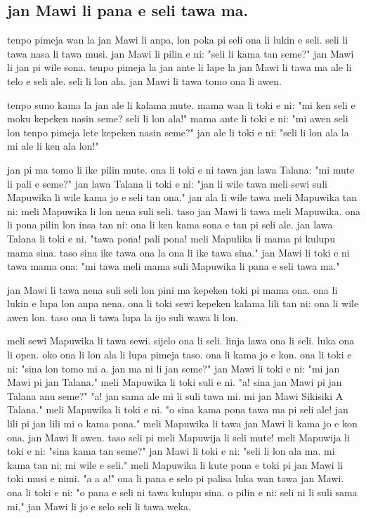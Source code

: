 \newpage
\subsection{jan Mawi li pana e seli tawa ma.}

tenpo pimeja wan la jan Mawi li anpa, lon poka pi seli ona li lukin e seli. 
seli li tawa nasa li tawa musi. 
jan Mawi li pilin e ni: "seli li kama tan seme?" 
jan Mawi li jan pi wile sona. 
tenpo pimeja la jan ante li lape la jan Mawi li tawa ma ale li telo e seli ale. 
seli li lon ala. 
jan Mawi li tawa tomo ona li awen.

tenpo suno kama la jan ale li kalama mute.
mama wan li toki e ni: "mi ken seli e moku kepeken nasin seme? 
seli li lon ala!"
mama ante li toki e ni: "mi awen seli lon tenpo pimeja lete kepeken nasin seme?"
jan ale li toki e ni: "seli li lon ala la mi ale li ken ala lon!"

jan pi ma tomo li ike pilin mute. 
ona li toki e ni tawa jan lawa Talana: "mi mute li pali e seme?"
jan lawa Talana li toki e ni: "jan li wile tawa meli sewi suli Mapuwika li wile kama jo e seli tan ona."
jan ala li wile tawa meli Mapuwika tan ni: meli Mapuwika li lon nena suli seli. 
taso jan Mawi li tawa meli Mapuwika. 
ona li pona pilin lon insa tan ni: ona li ken kama sona e tan pi seli ale.
jan lawa Talana li toki e ni. 
"tawa pona!
pali pona!
meli Mapulika li mama pi kulupu mama sina. 
taso sina ike tawa ona la ona li ike tawa sina."
jan Mawi li toki e ni tawa mama ona: "mi tawa meli mama suli Mapuwika li pana e seli tawa ma."

jan Mawi li tawa nena suli seli lon pini ma kepeken toki pi mama ona. 
ona li lukin e lupa lon anpa nena. 
ona li toki sewi kepeken kalama lili tan ni: ona li wile awen lon. 
taso ona li tawa lupa la ijo suli wawa li lon.

meli sewi Mapuwika li tawa sewi. 
sijelo ona li seli. 
linja lawa ona li seli. 
luka ona li open. 
oko ona li lon ala li lupa pimeja taso. 
ona li kama jo e kon.
ona li toki e ni: "sina lon tomo mi a. 
jan ma ni li jan seme?"
jan Mawi li toki e ni: "mi jan Mawi pi jan Talana."
meli Mapuwika li toki suli e ni. 
"a! 
sina jan Mawi pi jan Talana anu seme?"
"a! 
jan sama ale mi li suli tawa mi. 
mi jan Mawi Sikisiki A Talana."
meli Mapuwika li toki e ni. 
"o sina kama pona tawa ma pi seli ale! 
jan lili pi jan lili mi o kama pona."
meli Mapuwika li tawa jan Mawi li kama jo e kon ona. 
jan Mawi li awen. 
taso seli pi meli Mapuwija li seli mute!
meli Mapuwija li toki e ni: "sina kama tan seme?"
jan Mawi li toki e ni: "seli li lon ala ma. 
mi kama tan ni: mi wile e seli."
meli Mapuwika li kute pona e toki pi jan Mawi li toki musi e nimi. "a a a!" 
ona li pana e selo pi palisa luka wan tawa jan Mawi. 
ona li toki e ni: "o pana e seli ni tawa kulupu sina. 
o pilin e ni: seli ni li suli sama mi."
jan Mawi li jo e selo seli li tawa weka.


